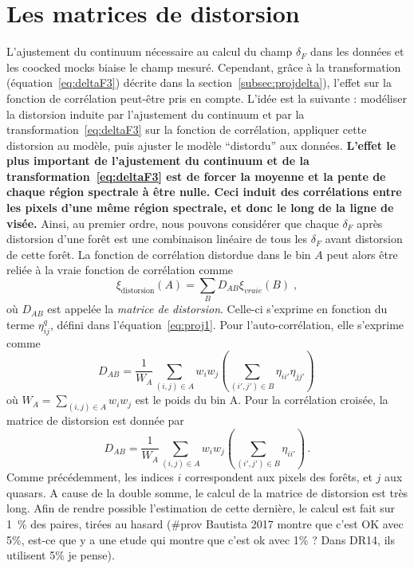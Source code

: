 \documentclass[11pt, twoside, a4paper, openright]{report}
\begin{document}
\section{Les matrices de distorsion}
\label{sec:calcul_dmat}
L'ajustement du continuum nécessaire au calcul du champ $\delta_F$ dans les données et les coocked mocks biaise le champ mesuré. Cependant, grâce à la transformation (équation~\ref{eq:deltaF3}) décrite dans la section~\ref{subsec:projdelta}), l'effet sur la fonction de corrélation peut-être pris en compte.
L'idée est la suivante : modéliser la distorsion induite par l'ajustement du continuum et par la transformation~\ref{eq:deltaF3} sur la fonction de corrélation, appliquer cette distorsion au modèle, puis ajuster le modèle ``distordu'' aux données.
\textbf{L'effet le plus important de l'ajustement du continuum et de la transformation~\ref{eq:deltaF3} est de forcer la moyenne et la pente de chaque région spectrale à être nulle. Ceci induit des corrélations entre les pixels d'une même région spectrale, et donc le long de la ligne de visée.}
Ainsi, au premier ordre, nous pouvons considérer que chaque $\delta_F$ après distorsion d'une forêt est une combinaison linéaire de tous les $\delta_F$ avant distorsion de cette forêt.
La fonction de corrélation distordue dans le bin $A$ peut alors être reliée à la vraie fonction de corrélation comme
\begin{equation}
  \xi_{\mathrm{distorsion}}(A) = \sum_{B} D_{AB}\xi_{vraie}(B) \; , 
\end{equation}
où $D_{AB}$ est appelée la \emph{matrice de distorsion}. Celle-ci s'exprime en fonction du terme $\eta_{ij}^q$, défini dans l'équation~\ref{eq:proj1}. Pour l'auto-corrélation, elle s'exprime comme
\begin{equation}
  \label{eq:dmat}
  D_{AB} = \frac{1}{W_A} \sum_{(i,j)\in A} w_i w_j \left( \sum_{(i',j')\in B} \eta_{ii'} \eta_{jj'} \right) \,
\end{equation}
où $W_{A} = \sum_{(i,j)\in A} w_i w_j$ est le poids du bin A. Pour la corrélation croisée, la matrice de distorsion est donnée par
\begin{equation}
  \label{eq:xdmat}
  D_{AB} = \frac{1}{W_A} \sum_{(i,j)\in A} w_i w_j \left( \sum_{(i',j')\in B} \eta_{ii'} \right) \, .
\end{equation}
Comme précédemment, les indices $i$ correspondent aux pixels des forêts, et $j$ aux quasars. A cause de la double somme, le calcul de la matrice de distorsion est très long. Afin de rendre possible l'estimation de cette dernière, le calcul est fait sur \SI{1}{\percent} des paires, tirées au hasard (\#prov Bautista 2017 montre que c'est OK avec 5\%, est-ce que y a une etude qui montre que c'est ok avec 1\% ? Dans DR14, ils utilisent 5\% je pense).
\end{document}
